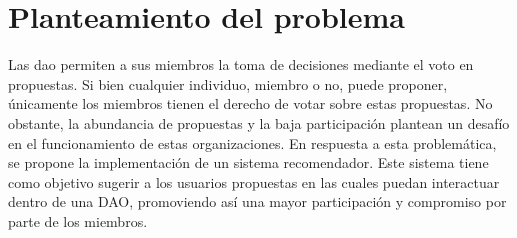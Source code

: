 \chapter{Planteamiento del problema}
\label{ch:planteamiento-problema}


Las \gls{dao} permiten a sus miembros la toma de decisiones mediante el voto en propuestas. Si bien cualquier individuo, miembro o no, puede proponer, únicamente los miembros tienen el derecho de votar sobre estas propuestas. No obstante, la abundancia de propuestas y la baja participación plantean un desafío en el funcionamiento de estas organizaciones. En respuesta a esta problemática, se propone la implementación de un sistema recomendador. Este sistema tiene como objetivo sugerir a los usuarios propuestas en las cuales puedan interactuar dentro de una DAO, promoviendo así una mayor participación y compromiso por parte de los miembros.

